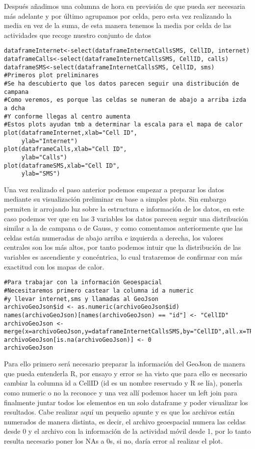 \documentclass[11pt, a4paper]{article} %
\begin{document}
Después añadimos una columna de hora en previsión de que pueda ser necesaria más adelante y por último agrupamos por celda, pero esta vez realizando la media en vez de la suma, de esta manera tenemos la media por celda de las actividades que recoge nuestro conjunto de datos
\begin{lstlisting}
dataframeInternet<-select(dataframeInternetCallsSMS, CellID, internet)
dataframeCalls<-select(dataframeInternetCallsSMS, CellID, calls)
dataframeSMS<-select(dataframeInternetCallsSMS, CellID, sms)
#Primeros plot preliminares
#Se ha descubierto que los datos parecen seguir una distribución de campana
#Como veremos, es porque las celdas se numeran de abajo a arriba izda a dcha
#Y conforme llegas al centro aumenta
#Estos plots ayudan tmb a determinar la escala para el mapa de calor
plot(dataframeInternet,xlab="Cell ID",
     ylab="Internet")
plot(dataframeCalls,xlab="Cell ID",
     ylab="Calls")
plot(dataframeSMS,xlab="Cell ID",
     ylab="SMS")
\end{lstlisting}
Una vez realizado el paso anterior podemos empezar a preparar los datos mediante su visualización preliminar en base a simples plots. Sin embargo permiten ir arrojando luz sobre la estructura e información de los datos, en este caso podemos ver que en las 3 variables los datos parecen seguir una distribución similar a la de campana o de Gauss, y como comentamos anteriormente que las celdas están numeradas de abajo arriba e izquierda a derecha, los valores centrales son los más altos, por tanto podemos intuir que la distribución de las variables es ascendiente y concéntrica, lo cual trataremos de confirmar con más exactitud con los mapas de calor.
\begin{lstlisting}
#Para trabajar con la información Geoespacial
#Necesitaremos primero castear la columna id a numeric
#y llevar internet,sms y llamadas al GeoJson
archivoGeoJson$id <- as.numeric(archivoGeoJson$id)
names(archivoGeoJson)[names(archivoGeoJson) == "id"] <- "CellID"
archivoGeoJson <- merge(x=archivoGeoJson,y=dataframeInternetCallsSMS,by="CellID",all.x=TRUE)
archivoGeoJson[is.na(archivoGeoJson)] <- 0
archivoGeoJson
\end{lstlisting}
Para ello primero será necesario preparar la información del GeoJson de manera que pueda entenderla R, por ensayo y error se ha visto que para ello es necesario cambiar la columna id a CellID (id es un nombre reservado y R se lía), ponerla como numeric o no la reconoce y una vez allí podemos hacer un left join para finalmente juntar todos los elementos en un solo dataframe y poder visualizar los resultados. Cabe realizar aquí un pequeño apunte y es que los archivos están numerados de manera distinta, es decir, el archivo geoespacial numera las celdas desde 0 y el archivo con la información de la actividad móvil desde 1, por lo tanto resulta necesario poner los NAs a 0s, si no, daría error al realizar el plot.
\end{document}
